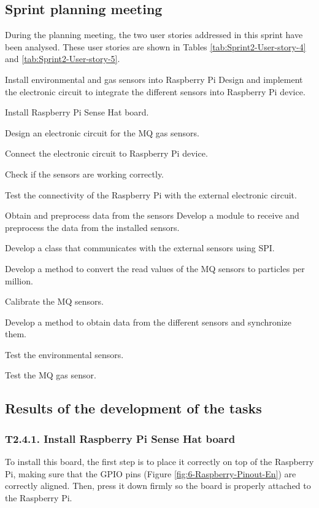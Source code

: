 \subsection{Sprint planning meeting}
During the planning meeting, the two user stories addressed in this sprint have been analysed. These user stories are shown in Tables \ref{tab:Sprint2-User-story-4} and \ref{tab:Sprint2-User-story-5}.

{Install environmental and gas sensors into Raspberry Pi}
{Design and implement the electronic circuit to integrate the different sensors into Raspberry Pi device.}
{	\item Install Raspberry Pi Sense Hat board.
	\item Design an electronic circuit for the MQ gas sensors.
	\item Connect the electronic circuit to Raspberry Pi device.
}{	\item Check if the sensors are working correctly.
	\item Test the connectivity of the Raspberry Pi with the external electronic circuit.
}

{Obtain and preprocess data from the sensors}
{Develop a module to receive and preprocess the data from the installed sensors.}
{	\item Develop a class that communicates with the external sensors using \ac{SPI}.
	\item Develop a method to convert the read values of the MQ sensors to particles per million.
	\item Calibrate the MQ sensors.
	\item Develop a method to obtain data from the different sensors and synchronize them.
}{	\item Test the environmental sensors.
	\item Test the MQ gas sensor.
}


\subsection{Results of the development of the tasks}

\subsubsection{T2.4.1. Install Raspberry Pi Sense Hat board}
To install this board, the first step is to place it correctly on top of the Raspberry Pi, making sure that the GPIO pins (Figure \ref{fig:6-Raspberry-Pinout-En}) are correctly aligned. Then, press it down firmly so the board is properly attached to the Raspberry Pi.

